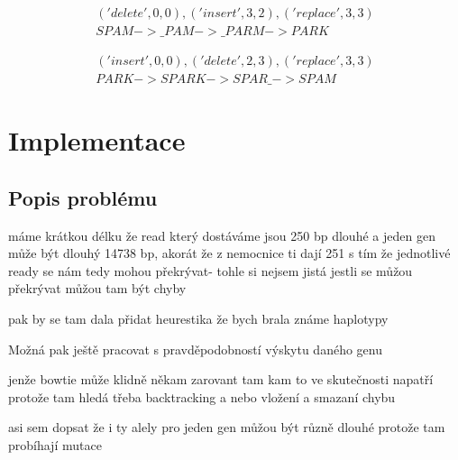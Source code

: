 \documentclass[czech,DP]{thesiskiv}
\numberwithin{equation}{section}
\begin{document}
\begin{align}
   \label{leve_1} ('delete', 0, 0), ('insert', 3, 2), ('replace', 3, 3) \\
    SPAM -> \_PAM -> \_PARM -> PARK \nonumber
\end{align}

\begin{align}
   \label{leve_2} ('insert', 0, 0), ('delete', 2, 3), ('replace', 3, 3) \\
    PARK -> SPARK -> SPAR\_ -> SPAM \nonumber
\end{align}



\chapter{Implementace}
\section{Popis problému}
máme krátkou délku
že read který dostáváme jsou 250 bp dlouhé a jeden gen může být dlouhý 14738 bp, akorát že z nemocnice ti dají 251
s tím že jednotlivé ready se nám tedy mohou překrývat- tohle si nejsem jistá jestli se můžou překrývat
můžou tam být chyby


pak by se tam dala přidat heurestika že bych brala známe haplotypy

Možná pak ještě pracovat s pravděpodobností výskytu daného genu


jenže bowtie může klidně někam zarovant tam kam to ve skutečnosti napatří protože tam hledá třeba backtracking a nebo vložení a smazaní chybu


asi sem dopsat že i ty alely pro jeden gen můžou být různě dlouhé protože tam probíhají mutace
\end{document}
